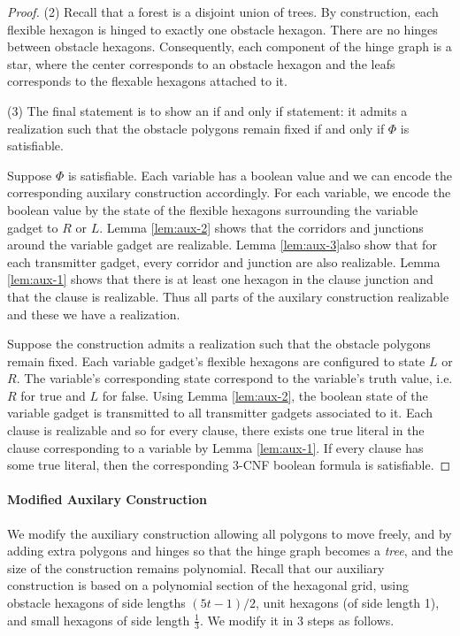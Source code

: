\begin{proof}
\noindent (2) Recall that a forest is a disjoint union of trees. 
By construction, each flexible hexagon is hinged to exactly one obstacle hexagon.  
There are no hinges between obstacle hexagons.
Consequently, each component of the hinge graph is a star, where the center corresponds to an obstacle hexagon and the leafs corresponds to the flexable hexagons attached to it.

\noindent (3) The final statement is to show an if and only if statement: it admits a realization such that the obstacle polygons remain fixed if and only if $\Phi$ is satisfiable.

Suppose $\Phi$ is satisfiable.%
Each variable has a boolean value and we can encode the corresponding auxilary construction accordingly. 
For each variable, we encode the boolean value by the state of the flexible hexagons surrounding the variable gadget to $R$ or $L$.  
Lemma \ref{lem:aux-2} shows that the corridors and junctions around the variable gadget are realizable.
Lemma \ref{lem:aux-3}also show that for each transmitter gadget, every corridor and junction are also realizable. 
Lemma \ref{lem:aux-1} shows that there is at least one hexagon in the clause junction and that the clause is realizable.
Thus all parts of the auxilary construction realizable and these we have a realization.

Suppose the construction admits a realization such that the obstacle polygons remain fixed.
Each variable gadget's flexible hexagons are configured to state $L$ or $R$. 
The variable's corresponding state correspond to the variable's truth value, i.e. $R$ for true and $L$ for false.
Using Lemma \ref{lem:aux-2}, the boolean state of the variable gadget is transmitted to all transmitter gadgets associated to it.
Each clause is realizable and so for every clause, there exists one true literal in the clause corresponding to a variable by Lemma \ref{lem:aux-1}. 
If every clause has some true literal, then the corresponding 3-CNF boolean formula is satisfiable.
\end{proof}
\paragraph{Modified Auxilary Construction}
We modify the auxiliary construction allowing all polygons to move freely, and by adding extra polygons and hinges so that the hinge graph becomes a \emph{tree}, and the size of the construction remains polynomial. 
Recall that our auxiliary construction is based on a polynomial section of the hexagonal grid, using obstacle hexagons of side lengths $(5t-1)/2$, unit hexagons (of side length 1), and small hexagons of side length $\frac{1}{3}$. 
We modify it in 3 steps as follows.

